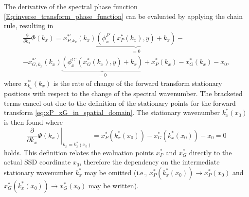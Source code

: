 The derivative of the spectral phase function \eqref{Eq:inverse_transform_phase_function} can be evaluated by applying the chain rule, resulting in
\begin{multline}
\label{eq:spectral_phase_first_derivative}
\frac{\partial}{\partial k_x}\Phi(k_x) =  
  x^{*'}_{P,k_x}(k_x) \underbrace{ \left( \phi^{P'}_x(x^*_P(k_x),y)  + k_x \right)}_{ = 0} - \\	
- x^{*'}_{G,k_x}(k_x) \underbrace{ \left( \phi^{G'}_x(x^*_G(k_x),y)  + k_x \right) }_{ = 0} 
+x^*_P(k_x)- x^*_G(k_x) -  x_0,
\end{multline}
where $x^{*'}_{k_x}(k_x)$ is the rate of change of the forward transform stationary positions with respect to the change of the spectral wavenumber.
The bracketed terms cancel out due to the definition of the stationary points for the forward transform \eqref{eq:xP_xG_in_spatial_domain}.
The stationary wavenumber $k_x^*(x_0)$ is then found where
\begin{equation}
\label{eq:xP_xG_in_spectral_domain}
\left. \frac{\partial}{\partial k_x}\Phi(k_x) \right|_{k_x=k_x^*(x_0)} = x^*_P(k_x^*(x_0))- x^*_G(k_x^*(x_0)) -  x_0 = 0
\end{equation}
holds.
This definition relates the evaluation points $x^*_P$ and $x^*_G$ directly to the actual SSD coordinate $x_0$, therefore the dependency on the intermediate stationary wavenumber $k_x^*$ may be omitted (i.e., $x^*_P(k_x^*(x_0)) \rightarrow x^*_P(x_0)$ and $x^*_G(k_x^*(x_0)) \rightarrow x^*_G(x_0)$ may be written). 

